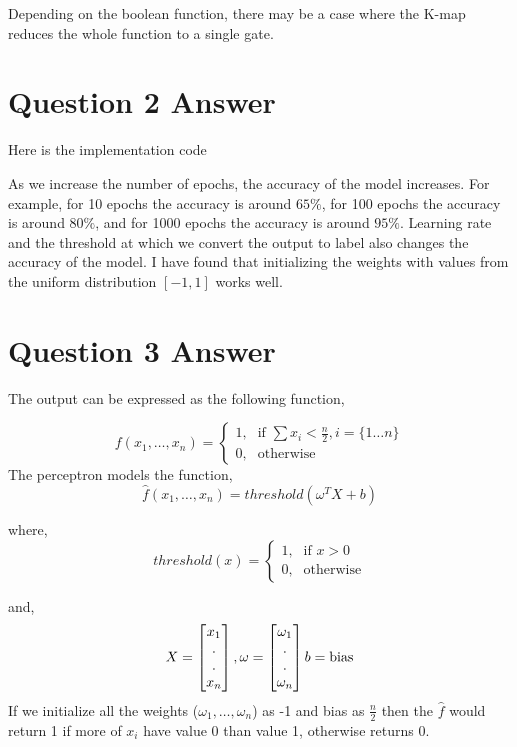 \documentclass{article}
\begin{document}
Depending on the boolean function, there may be a case where the K-map reduces the whole function to a single gate.

\section*{Question 2 Answer}
Here is the implementation code


As we increase the number of epochs, the accuracy of the model increases. For example, for 10 epochs the accuracy is around $65\%$, for 100 epochs the accuracy is around $80\%$, and for 1000 epochs the accuracy is around $95\%$. Learning rate and the threshold at which we convert the output to label also changes the accuracy of the model. I have found that initializing the weights with values from the uniform distribution $[-1,1]$ works well.
\section*{Question 3 Answer}

The output can be expressed as the following function,

\begin{displaymath}
    f(x_1,\dots,x_n) = 
    \begin{cases} 
        \mbox{1,} & \mbox{if } \sum x_i < \frac{n}{2}, i = \{1\dots n\} \\ 
        \mbox{0,} & \mbox{otherwise} 
    \end{cases} 
\end{displaymath}
%
The perceptron models the function,
\begin{displaymath}
    \hat{f}(x_1,\dots,x_n) = threshold(\omega^T X + b)
\end{displaymath}

where,
\begin{displaymath}
    threshold(x) = 
    \begin{cases}
        \mbox{1,} & \mbox{if } x > 0 \\
        \mbox{0,} & \mbox{otherwise}
    \end{cases}
\end{displaymath}

and,
\begin{displaymath}
    X = \begin{bmatrix}x_1\\ . \\ . \\x_n\end{bmatrix},\\
    \omega = \begin{bmatrix}\omega_1\\ . \\ . \\\omega_n\end{bmatrix} \\
    b = \mbox{bias}
\end{displaymath}
%
If we initialize all the weights ($\omega_1,\dots,\omega_n$) as -1 and bias as $\frac{n}{2}$ then the $\hat{f}$ would return 1 if more of  $x_i$ have value 0 than value 1, otherwise returns 0.
\end{document}
